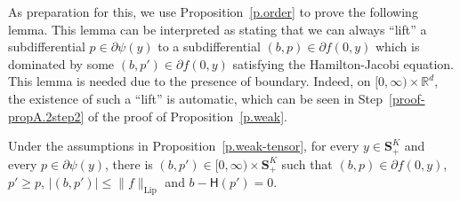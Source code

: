 \documentclass[AHL,Unicode,longabstracts,published]{cedram}
\newcommand{\R}{\mathbb{R}}
\renewcommand{\S}{\mathbf{S}}
\newcommand{\Lip}{\mathrm{Lip}}
\renewcommand{\H}{\mathsf{H}}
\renewcommand{\leq}{\leqslant}
\renewcommand{\geq}{\geqslant}
\begin{document}
As preparation for this, we use Proposition~\ref{p.order} to prove the following lemma. This lemma can be interpreted as stating that we can always ``lift'' a subdifferential $p\in\partial\psi(y)$ to a subdifferential $(b,p)\in\partial f(0,y)$ which is dominated by some $(b,p')\in\partial f(0,y)$ satisfying the Hamilton-Jacobi equation. This lemma is needed due to the presence of boundary. Indeed, on $[0,\infty)\times \R^d$, the existence of such a ``lift'' is automatic, which can be seen in Step~\ref{proof-propA.2step2} of the proof of Proposition~\ref{p.weak}.


\begin{lemm}\label{l.lift}
Under the assumptions in Proposition~\ref{p.weak-tensor}, for every $y\in\S^K_+$ and every $p\in \partial \psi(y)$, there is $(b,p')\in [0,\infty)\times\S^K_+$ such that $(b,p)\in \partial f(0,y)$, $p'\geq p$, $|(b,p')|\leq \|f\|_{\Lip}$ and $b-\H(p')= 0$.
\end{lemm}
\end{document}
